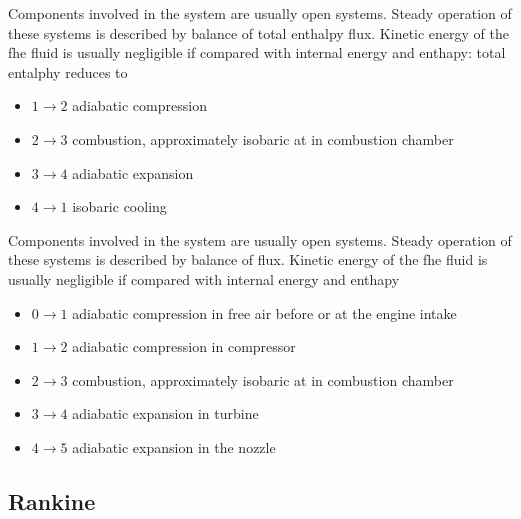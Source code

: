 \documentclass[letterpaper,10pt,english]{jupyterBook}
\begin{document}
\sphinxAtStartPar
{} Components involved in the system are usually open systems. Steady operation of these systems is described by balance of total enthalpy flux. Kinetic energy of the fhe fluid is usually negligible if compared with internal energy and enthapy: total entalphy reduces to 
\begin{itemize}
\item {} 
\sphinxAtStartPar
\(1 \rightarrow 2\) adiabatic compression

\item {} 
\sphinxAtStartPar
\(2 \rightarrow 3\) combustion, approximately isobaric at in combustion chamber

\item {} 
\sphinxAtStartPar
\(3 \rightarrow 4\) adiabatic expansion

\item {} 
\sphinxAtStartPar
\(4 \rightarrow 1\) isobaric cooling

\end{itemize}

\sphinxAtStartPar
{} Components involved in the system are usually open systems. Steady operation of these systems is described by balance of  flux. Kinetic energy of the fhe fluid is usually  negligible if compared with internal energy and enthapy
\begin{itemize}
\item {} 
\sphinxAtStartPar
\(0 \rightarrow 1\) adiabatic compression in free air before or at the engine intake

\item {} 
\sphinxAtStartPar
\(1 \rightarrow 2\) adiabatic compression in compressor

\item {} 
\sphinxAtStartPar
\(2 \rightarrow 3\) combustion, approximately isobaric at in combustion chamber

\item {} 
\sphinxAtStartPar
\(3 \rightarrow 4\) adiabatic expansion in turbine

\item {} 
\sphinxAtStartPar
\(4 \rightarrow 5\) adiabatic expansion in the nozzle

\end{itemize}


\subsection{Rankine}
\label{\detokenize{ch/heat-engines:rankine}}\label{\detokenize{ch/heat-engines:classical-thermodynamics-heat-engines-real-rankine}}
\sphinxAtStartPar
{}
\end{document}
